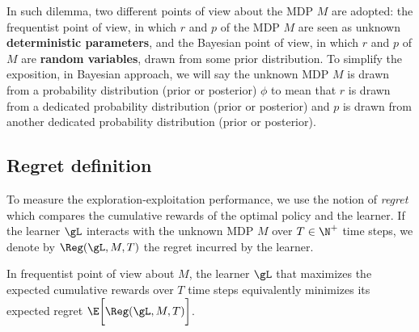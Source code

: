 In such dilemma, two different points of view about the MDP $M$ are adopted: the frequentist point of view, in which $r$ and $p$ of the MDP $M$ are seen as unknown \textbf{deterministic parameters}, and the Bayesian point of view, in which $r$ and $p$ of $M$ are \textbf{random variables}, drawn from some prior distribution.
To simplify the exposition, in Bayesian approach, we will say the unknown MDP $M$ is drawn from a probability distribution (prior or posterior) $\phi$ to mean that $r$ is drawn from a dedicated probability distribution (prior or posterior) and $p$ is drawn from another dedicated probability distribution (prior or posterior).
%

\subsection{Regret definition}

To measure the exploration-exploitation performance, we use the notion of \emph{regret} which compares the cumulative rewards of the optimal policy and the learner. 
If the learner $\gL$ interacts with the unknown MDP $M$ over $T\in\N^+$ time steps, we denote by $\Reg(\gL, M, T)$ the regret incurred by the learner.

In frequentist point of view about $M$, the learner $\gL$ that maximizes the expected cumulative rewards over $T$ time steps equivalently minimizes its expected regret $\E\bigg[\Reg(\gL, M, T)\bigg]$.


